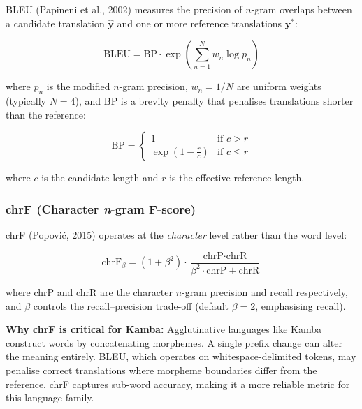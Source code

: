 \documentclass[12pt,a4paper]{article}
\begin{document}
BLEU (Papineni et al., 2002) measures the precision of \(n\)-gram overlaps between a candidate translation \(\hat{\mathbf{y}}\) and one or more reference translations \(\mathbf{y}^*\):

\begin{equation}
    \text{BLEU} = \text{BP} \cdot \exp\!\left(\sum_{n=1}^{N} w_n \log p_n\right)
\end{equation}

where \(p_n\) is the modified \(n\)-gram precision, \(w_n = 1/N\) are uniform weights (typically \(N = 4\)), and BP is a brevity penalty that penalises translations shorter than the reference:

\begin{equation}
    \text{BP} = \begin{cases} 1 & \text{if } c > r \\ \exp\!\left(1 - \frac{r}{c}\right) & \text{if } c \leq r \end{cases}
\end{equation}

where \(c\) is the candidate length and \(r\) is the effective reference length.

\subsubsection{chrF (Character \textit{n}-gram F-score)}

chrF (Popovi\'{c}, 2015) operates at the \emph{character} level rather than the word level:

\begin{equation}
    \text{chrF}_\beta = (1 + \beta^2) \cdot \frac{\text{chrP} \cdot \text{chrR}}{\beta^2 \cdot \text{chrP} + \text{chrR}}
\end{equation}

where chrP and chrR are the character \(n\)-gram precision and recall respectively, and \(\beta\) controls the recall--precision trade-off (default \(\beta = 2\), emphasising recall).

\textbf{Why chrF is critical for Kamba:} Agglutinative languages like Kamba construct words by concatenating morphemes. A single prefix change can alter the meaning entirely. BLEU, which operates on whitespace-delimited tokens, may penalise correct translations where morpheme boundaries differ from the reference. chrF captures sub-word accuracy, making it a more reliable metric for this language family.

\end{document}
